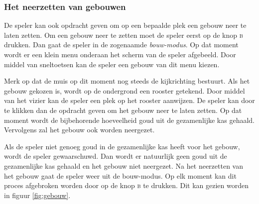 \documentclass[a4paper,11pt, twoside]{article}
\begin{document}
    \FloatBarrier
    \subsubsection{Het neerzetten van gebouwen}
    De speler kan ook opdracht geven om op een bepaalde plek een gebouw neer te laten zetten. Om een gebouw neer te zetten moet de speler eerst op de knop \textsc{b} drukken. Dan gaat de speler in de zogenaamde \emph{bouw-modus}. Op dat moment wordt er een klein menu onderaan het scherm van de speler afgebeeld. Door middel van sneltoetsen kan de speler een gebouw van dit menu kiezen.

    Merk op dat de muis op dit moment nog steeds de kijkrichting bestuurt. Als het gebouw gekozen is, wordt op de ondergrond een rooster getekend. Door middel van het vizier kan de speler een plek op het rooster aanwijzen. De speler kan door te klikken dan de opdracht geven om het gebouw neer te laten zetten. Op dat moment wordt de bijbehorende hoeveelheid goud uit de gezamenlijke kas gehaald. Vervolgens zal het gebouw ook worden neergezet.

    Als de speler niet genoeg goud in de gezamenlijke kas heeft voor het gebouw, wordt de speler gewaarschuwd. Dan wordt er natuurlijk geen goud uit de gezamenlijke kas gehaald en het gebouw niet neergezet. Na het neerzetten van het gebouw gaat de speler weer uit de bouw-modus. Op elk moment kan dit proces afgebroken worden door op de knop \textsc{b} te drukken. Dit kan gezien worden in figuur \ref{fig:gebouw}.
\end{document}
